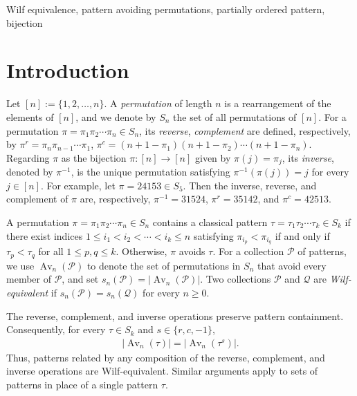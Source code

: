 \documentclass[11pt]{article}
\begin{document}
 Wilf equivalence, 
pattern avoiding permutations, 
partially ordered pattern, 
bijection  
	
\section{Introduction}\label{intro-sec} 
Let $[n]:=\{1,2,\ldots,n\}$. A \emph{permutation} of length $n$ is a
rearrangement of the elements of $[n]$, and we denote by $S_n$ the set
of all permutations of $[n]$. 
For a permutation $\pi=\pi_1\pi_2\cdots\pi_n\in S_n$, its \emph{reverse},
\emph{complement} are defined, respectively, by
$\pi^r=\pi_n\pi_{n-1}\cdots\pi_1$, $\pi^c=(n+1-\pi_1)(n+1-\pi_2)\cdots(n+1-\pi_n)$.
Regarding $\pi$ as the bijection $\pi\colon[n]\to[n]$ given by
$\pi(j)=\pi_j$, its \emph{inverse}, denoted by $\pi^{-1}$, is the
unique permutation satisfying $\pi^{-1}(\pi(j))=j$ for every $j\in[n]$.
For example, let $\pi=24153\in S_5$. Then the inverse, reverse, and
complement of $\pi$ are, respectively, $\pi^{-1}=31524$, $\pi^r=35142$, and $\pi^c=42513$.


A permutation $\pi=\pi_1\pi_2\cdots\pi_n\in S_n$ contains a classical pattern
$\tau=\tau_1\tau_2\cdots\tau_k\in S_k$ if there exist indices
$1\leq i_1<i_2<\cdots<i_k\leq n$ satisfying
$\pi_{i_p}<\pi_{i_q}$ if and only if $\tau_p<\tau_q$ for all
$1\leq p,q\leq k$.
Otherwise, $\pi$ avoids $\tau$. 
For a collection $\mathcal P$ of patterns,
we use $\operatorname{Av}_n(\mathcal P)$ to denote the set of permutations in $S_n$
that avoid every member of $\mathcal P$, and set
$s_n(\mathcal P)=|\operatorname{Av}_n(\mathcal P)|$. 
Two collections $\mathcal P$ and $\mathcal Q$ are \emph{Wilf-equivalent} if
$s_n(\mathcal P)=s_n(\mathcal Q)$ for every $n\geq0$.

The reverse, complement, and inverse operations preserve pattern
containment. Consequently, for every $\tau\in S_k$ and
$s\in\{r,c,-1\}$,
\begin{align*}
|\operatorname{Av}_n(\tau)|
   =|\operatorname{Av}_n(\tau^s)|.
\end{align*}
Thus, patterns related by any composition of the reverse, complement, and
inverse operations are Wilf-equivalent. Similar arguments apply to sets of
patterns in place of a single pattern $\tau$.
\end{document}
